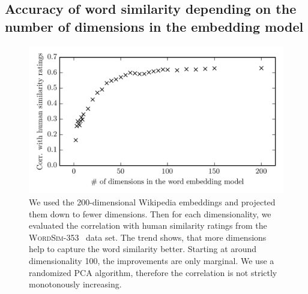 \documentclass[
        a4paper,
        titlepage,
        twoside,
        parskip,
        numbers=noenddot
        ]{scrbook}
\theoremstyle{break}
\begin{document}
\begin{appendices}
  \subsection{Accuracy of word similarity depending on the number of dimensions in the embedding model}
  \label{sec:embedding_model_dimensions_vs_similarity_corr}
  \begin{figure}[H]
         \centering
         \includegraphics[width=\textwidth]{figures/embedding_model_dimensions_vs_similarity_corr.png}
         \caption{We used the 200-dimensional Wikipedia embeddings and projected them down to fewer dimensions. Then for each dimensionality, we evaluated the correlation with human similarity ratings from the \textsc{WordSim-353}~\cite{Agirre2009} data set. The trend shows, that more dimensions help to capture the word similarity better. Starting at around dimensionality 100, the improvements are only marginal. We use a randomized PCA algorithm, therefore the correlation is not strictly monotonously increasing.}
         \label{fig:embedding_model_dimensions_vs_similarity_corr}
  \end{figure}


\end{appendices}
\end{document}
